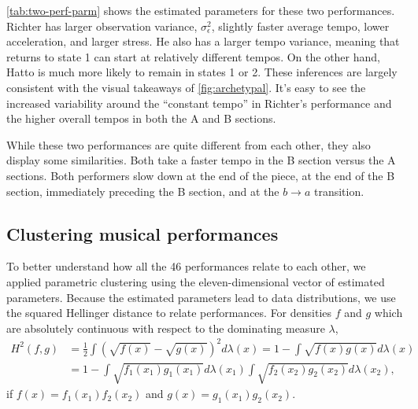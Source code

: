 \documentclass[12pt]{article}
\begin{document}
\autoref{tab:two-perf-parm} shows the estimated parameters for these
two performances. Richter has larger observation variance,
$\sigma^2_{\epsilon}$, slightly faster average tempo, lower
acceleration, and larger stress. He also has a larger tempo variance,
meaning that returns to state 1 can start at relatively different
tempos. On the other hand, Hatto is much more
likely to remain in states 1 or 2. These inferences are largely
consistent with the visual takeaways of \autoref{fig:archetypal}. It's
easy to see the increased variability around the ``constant tempo'' in
Richter's performance and the higher overall tempos in both the A and
B sections.

While these two performances are quite different from each other, they
also display some similarities. Both take a faster tempo in the B
section versus the A sections. Both performers slow down at the end of
the piece, at the end of the B section, immediately preceding the B section, and at the
$b\rightarrow a$ transition.

\subsection{Clustering musical performances}
\label{sec:clust-music-perf}

To better understand how all the 46 performances relate to each other,
we applied parametric clustering using the eleven-dimensional vector
of estimated parameters. Because the estimated parameters lead to data
distributions, we use the squared Hellinger distance to relate
performances. For densities $f$ and $g$ which are absolutely
continuous with respect to the dominating measure $\lambda$,
\begin{align*}
H^2(f,g) &= \frac{1}{2}\int \left(\sqrt{f(x)} - \sqrt{g(x)}\right)^2
           d\lambda(x) = 1-\int \sqrt{f(x)g(x)}d\lambda(x)\\
  &= 1-\int \sqrt{f_1(x_1)g_1(x_1)}d\lambda(x_1) \int \sqrt{f_2(x_2)g_2(x_2)}d\lambda(x_2),
\end{align*}
if $f(x)=f_1(x_1)f_2(x_2)$
and $g(x)=g_1(x_1)g_2(x_2)$.


\end{document}

